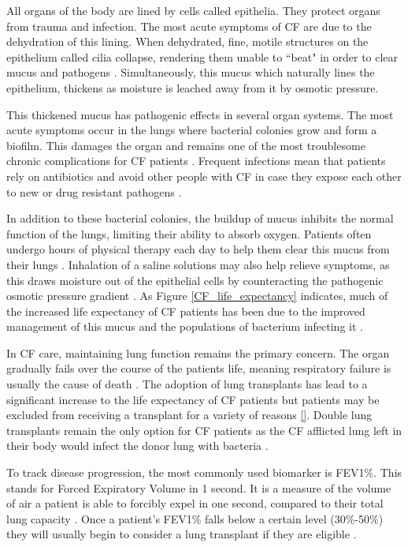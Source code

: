 All organs of the body are lined by cells called epithelia. They protect organs from trauma and infection. The most acute symptoms of CF are due to the dehydration of this lining. When dehydrated, fine, motile structures on the epithelium called cilia collapse, rendering them unable to ``beat" in order to clear mucus and pathogens \cite{boucher2007, szczesniak2017}. Simultaneously, this mucus which naturally lines the epithelium, thickens as moisture is leached away from it by osmotic pressure.

This thickened mucus has pathogenic effects in several organ systems. The most acute symptoms occur in the lungs where bacterial colonies grow and form a biofilm. This damages the organ and remains one of the most troublesome chronic complications for CF patients \cite{chiappini2014, krouse2001}. Frequent infections mean that patients rely on antibiotics and avoid other people with CF in case they expose each other to new or drug resistant pathogens \cite{conway2008, baldoni2019}. 

In addition to these bacterial colonies, the buildup of mucus inhibits the normal function of the lungs, limiting their ability to absorb oxygen. Patients often undergo hours of physical therapy each day to help them clear this mucus from their lungs \cite{chest_pt_CFF,thefreylife2015}. Inhalation of a saline solutions may also help relieve symptoms, as this draws moisture out of the epithelial cells by counteracting the pathogenic osmotic pressure gradient \cite{wark2018}.  As Figure \ref{CF_life_expectancy} indicates, much of the increased life expectancy of CF patients has been due to the improved management of this mucus and the populations of bacterium infecting it \cite{mcbennett2022}. 

In CF care, maintaining lung function remains the primary concern. The organ gradually fails over the course of the patients life, meaning respiratory failure is usually the cause of death \cite{kumar2018}. The adoption of lung transplants has lead to a significant increase to the life expectancy of CF patients but patients may be excluded from receiving a transplant for a variety of reasons \ref{}. Double lung transplants remain the only option for CF patients as the CF afflicted lung left in their body would infect the donor lung with bacteria \cite{mcbennett2022}. 

To track disease progression, the most commonly used biomarker is FEV1\%. This stands for Forced Expiratory Volume in 1 second. It is a measure of the volume of air a patient is able to forcibly expel in one second, compared to their total lung capacity \cite{szczesniak2017}. Once a patient's FEV1\% falls below a certain level (30\%-50\%) they will usually begin to consider a lung transplant if they are eligible \cite{adler2009}.

